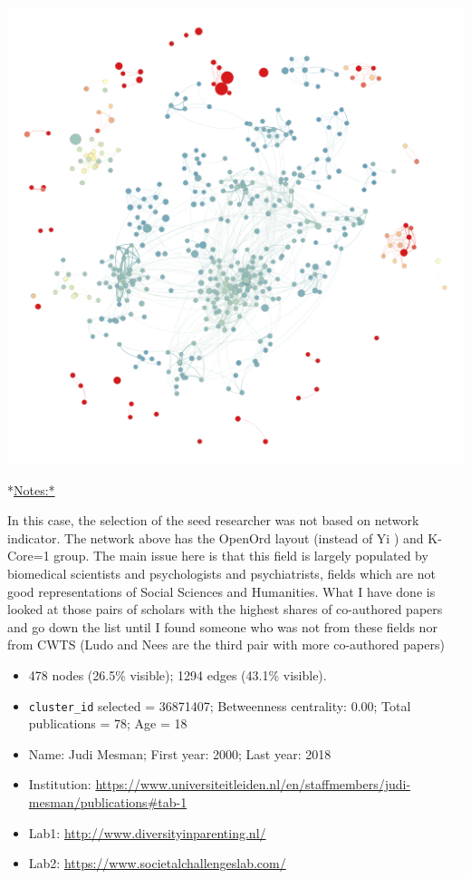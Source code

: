 \documentclass[]{article}
\providecommand{\tightlist}{%
  \setlength{\itemsep}{0pt}\setlength{\parskip}{0pt}}
\begin{document}
\includegraphics{figs/lu_soc_betweenness.png}

*\url{Notes:*}

In this case, the selection of the seed researcher was not based on
network indicator. The network above has the OpenOrd layout (instead of
Yi ) and K-Core=1 group. The main issue here is that this field is
largely populated by biomedical scientists and psychologists and
psychiatrists, fields which are not good representations of Social
Sciences and Humanities. What I have done is looked at those pairs of
scholars with the highest shares of co-authored papers and go down the
list until I found someone who was not from these fields nor from CWTS
(Ludo and Nees are the third pair with more co-authored papers)

\begin{itemize}
\tightlist
\item
  478 nodes (26.5\% visible); 1294 edges (43.1\% visible).
\item
  \texttt{cluster\_id} selected = 36871407; Betweenness centrality:
  0.00; Total publications = 78; Age = 18
\item
  Name: Judi Mesman; First year: 2000; Last year: 2018
\item
  Institution:
  \url{https://www.universiteitleiden.nl/en/staffmembers/judi-mesman/publications\#tab-1}
\item
  Lab1: \url{http://www.diversityinparenting.nl/}
\item
  Lab2: \url{https://www.societalchallengeslab.com/}
\end{itemize}
\end{document}

